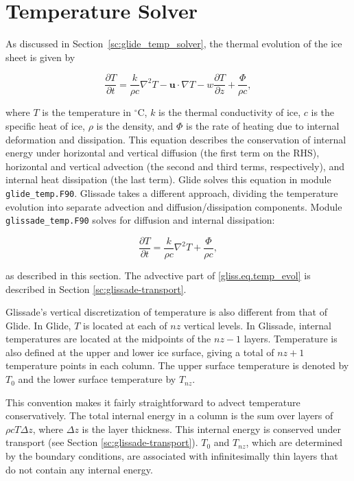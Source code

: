 
\section{Temperature Solver}
\label{sc:glissade-temperature}

As discussed in Section~\ref{sc:glide_temp_solver}, the thermal evolution of the ice sheet is given by

\begin{equation}
  \label{gliss.eq.temp_evol}
  \frac{\partial T}{\partial t} = 
  \frac{k}{\rho c} {{\nabla }^{2}}T - \mathbf{u} \cdot \nabla T - w\frac{\partial T}{\partial z} + \frac{\Phi }{\rho c},
\end{equation}

\noindent
where $T$ is the temperature in $^\circ$C, $k$ is the thermal conductivity of ice, $c$ is the specific heat of ice, 
$\rho$ is the density, and $\Phi$ is the rate of heating due to internal deformation and dissipation.
This equation describes the conservation of internal energy under horizontal and vertical 
diffusion (the first term on the RHS), horizontal and vertical advection 
(the second and third terms, respectively), and internal heat dissipation (the last term).
Glide solves this equation in module {\tt glide\_temp.F90}.
Glissade takes a different approach, dividing the temperature evolution into 
separate advection and diffusion/dissipation components.
Module {\tt glissade\_temp.F90} solves for diffusion and internal dissipation:

\begin{equation}
  \label{gliss.eq.vert_temp_evol}
  \frac{\partial T}{\partial t} = \frac{k}{\rho c}{{\nabla }^{2}}T + \frac{\Phi }{\rho c},
\end{equation}

\noindent
as described in this section.
The advective part of \eqref{gliss.eq.temp_evol} is described
in Section \ref{sc:glissade-transport}.

Glissade's vertical discretization of temperature is also different from that of Glide.
In Glide, $T$ is located at each of $nz$ vertical levels.
In Glissade, internal temperatures are located at the midpoints of the $nz-1$ layers.
Temperature is also defined at the upper and lower ice surface, giving a total
of $nz+1$ temperature points in each column.  The upper surface temperature is denoted
by $T_0$ and the lower surface temperature by $T_{nz}$.

This convention makes it fairly straightforward
to advect temperature conservatively.  The total internal energy in a column 
is the sum over layers of $\rho c T \Delta z$, where $\Delta z$ is the layer thickness.
This internal energy is conserved under transport (see Section \ref{sc:glissade-transport}).
$T_0$ and $T_{nz}$, which are determined by the boundary conditions, 
are associated with infinitesimally thin layers that do not contain
any internal energy.

